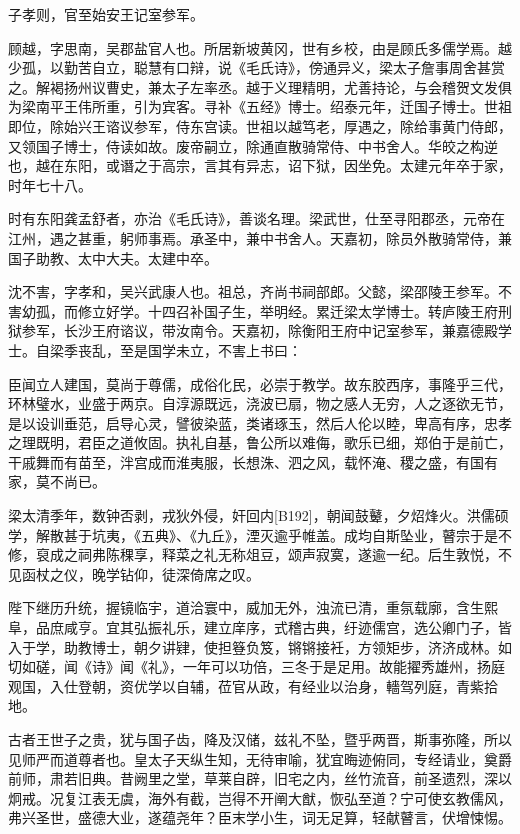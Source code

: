 \documentclass[]{article}
\begin{document}
子孝则，官至始安王记室参军。

顾越，字思南，吴郡盐官人也。所居新坡黄冈，世有乡校，由是顾氏多儒学焉。越少孤，以勤苦自立，聪慧有口辩，说《毛氏诗》，傍通异义，梁太子詹事周舍甚赏之。解褐扬州议曹史，兼太子左率丞。越于义理精明，尤善持论，与会稽贺文发俱为梁南平王伟所重，引为宾客。寻补《五经》博士。绍泰元年，迁国子博士。世祖即位，除始兴王谘议参军，侍东宫读。世祖以越笃老，厚遇之，除给事黄门侍郎，又领国子博士，侍读如故。废帝嗣立，除通直散骑常侍、中书舍人。华皎之构逆也，越在东阳，或谮之于高宗，言其有异志，诏下狱，因坐免。太建元年卒于家，时年七十八。

时有东阳龚孟舒者，亦治《毛氏诗》，善谈名理。梁武世，仕至寻阳郡丞，元帝在江州，遇之甚重，躬师事焉。承圣中，兼中书舍人。天嘉初，除员外散骑常侍，兼国子助教、太中大夫。太建中卒。

沈不害，字孝和，吴兴武康人也。祖总，齐尚书祠部郎。父懿，梁邵陵王参军。不害幼孤，而修立好学。十四召补国子生，举明经。累迁梁太学博士。转庐陵王府刑狱参军，长沙王府谘议，带汝南令。天嘉初，除衡阳王府中记室参军，兼嘉德殿学士。自梁季丧乱，至是国学未立，不害上书曰：

臣闻立人建国，莫尚于尊儒，成俗化民，必崇于教学。故东胶西序，事隆乎三代，环林璧水，业盛于两京。自淳源既远，浇波已扇，物之感人无穷，人之逐欲无节，是以设训垂范，启导心灵，譬彼染蓝，类诸琢玉，然后人伦以睦，卑高有序，忠孝之理既明，君臣之道攸固。执礼自基，鲁公所以难侮，歌乐已细，郑伯于是前亡，干戚舞而有苗至，泮宫成而淮夷服，长想洙、泗之风，载怀淹、稷之盛，有国有家，莫不尚已。

梁太清季年，数钟否剥，戎狄外侵，奸回内{[}B192{]}，朝闻鼓鼙，夕炤烽火。洪儒硕学，解散甚于坑夷，《五典》、《九丘》，湮灭逾乎帷盖。成均自斯坠业，瞽宗于是不修，裒成之祠弗陈稞享，释菜之礼无称俎豆，颂声寂寞，遂逾一纪。后生敦悦，不见函杖之仪，晚学钻仰，徒深倚席之叹。

陛下继历升统，握镜临宇，道洽寰中，威加无外，浊流已清，重氛载廓，含生熙阜，品庶咸亨。宜其弘振礼乐，建立庠序，式稽古典，纡迹儒宫，选公卿门子，皆入于学，助教博士，朝夕讲肄，使担簦负笈，锵锵接衽，方领矩步，济济成林。如切如磋，闻《诗》闻《礼》，一年可以功倍，三冬于是足用。故能擢秀雄州，扬庭观国，入仕登朝，资优学以自辅，莅官从政，有经业以治身，轖驾列庭，青紫拾地。

古者王世子之贵，犹与国子齿，降及汉储，兹礼不坠，暨乎两晋，斯事弥隆，所以见师严而道尊者也。皇太子天纵生知，无待审喻，犹宜晦迹俯同，专经请业，奠爵前师，肃若旧典。昔阙里之堂，草莱自辟，旧宅之内，丝竹流音，前圣遗烈，深以炯戒。况复江表无虞，海外有截，岂得不开阐大猷，恢弘至道？宁可使玄教儒风，弗兴圣世，盛德大业，遂蕴尧年？臣末学小生，词无足算，轻献瞽言，伏增悚惕。
\end{document}
